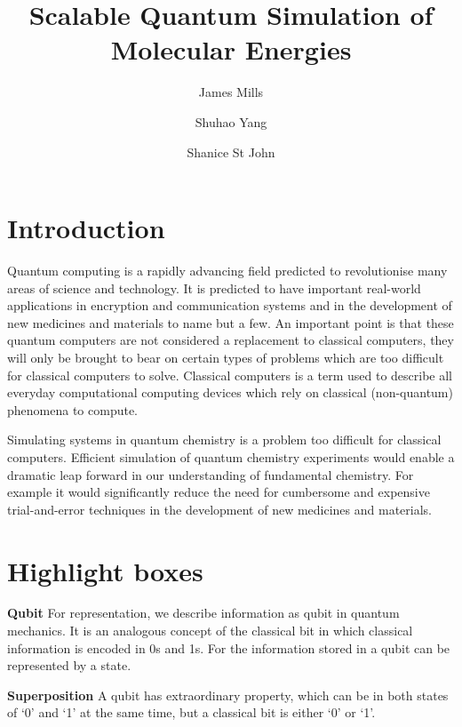 \documentclass[14pt,landscape,color=UCLdarkred,margin=3cm]{uclposter}
\title{Scalable Quantum Simulation of Molecular Energies}
\author{James Mills}
\author{Shuhao Yang}
\author{Shanice St John}
\affil[1]{Quantum Technologies, UCL}
\begin{document}
\large

\maketitle

\begin{multicols}{3}

\section*{Introduction}


Quantum computing is a rapidly advancing field predicted to revolutionise many
areas of science and technology. It is predicted to have important real-world applications in encryption and communication systems and in the development of new medicines and materials to name but a few. An important point is that these quantum computers are not considered a replacement to classical computers, they will only be brought to bear on certain types of problems which are too difficult for classical computers to solve. Classical computers is a term used to describe all everyday computational computing devices which rely on classical (non-quantum) phenomena to compute.

Simulating systems in quantum chemistry is a problem too difficult for classical computers. Efficient simulation of quantum chemistry experiments would enable a dramatic leap forward in our understanding of fundamental chemistry. For example it would significantly reduce the need for cumbersome and expensive trial-and-error techniques in the development of new medicines and materials.

\section*{Highlight boxes}


\begin{highlightbox}
	\textbf{Qubit} For representation, we describe information as qubit in quantum mechanics. It is an analogous concept of the classical bit in which classical information is encoded in 0s and 1s. For the information stored in a qubit can be represented by a state.
\end{highlightbox}

\begin{highlightbox}
  \textbf{Superposition} A qubit has extraordinary property, which can be in both states of `0' and `1' at the same time, but a classical bit is either `0' or `1'.
\end{highlightbox}




\end{multicols}
\end{document}
